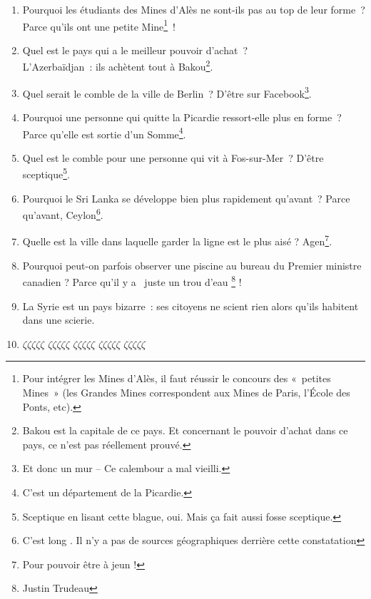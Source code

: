 \documentclass[10pt,a5paper,fullpage]{book}
\begin{document}
\begin{enumerate}
		\item Pourquoi les étudiants des Mines d’Alès ne sont-ils pas au top de leur forme~? Parce qu’ils ont une petite Mine\footnote{Pour intégrer les Mines d’Alès, il faut réussir le concours des « petites Mines » (les Grandes Mines correspondent aux Mines de Paris, l’École des Ponts, etc).}~!
		\item Quel est le pays qui a le meilleur pouvoir d’achat~? \\L’Azerbaïdjan~: ils achètent tout à Bakou\footnote{Bakou est la capitale de ce pays. Et concernant le pouvoir d'achat dans ce pays, ce n'est pas réellement prouvé.}.
		\item Quel serait le comble de la ville de Berlin~? D'être sur Facebook\footnote{ Et donc un mur -- Ce calembour a mal vieilli.}. 
		\item Pourquoi une personne qui quitte la Picardie ressort-elle plus en forme~? Parce qu'elle est sortie d'un Somme\footnote{C'est un département de la Picardie.}. 
		\item Quel est le comble pour une personne qui vit à Fos-sur-Mer~? D'être sceptique\footnote{Sceptique en lisant cette blague, oui. Mais ça fait aussi fosse sceptique.}.
		\item Pourquoi le Sri Lanka se développe bien plus rapidement qu'avant~? Parce qu'avant, Ceylon\footnote{\guillemotleft C'est long \guillemotright. Il n'y a pas de sources géographiques derrière cette constatation}. 
		\item Quelle est la ville dans laquelle garder la ligne est le plus aisé ? Agen\footnote{Pour pouvoir être à jeun !}.
		\item Pourquoi peut-on parfois observer une piscine au bureau du Premier ministre canadien ? Parce qu'il y a \guillemotleft~juste un trou d'eau \guillemotright \footnote{Justin Trudeau} !
		\item La Syrie est un pays bizarre~: ses citoyens ne scient rien alors qu'ils habitent dans une scierie. 
		\item $\zeta\zeta\zeta\zeta\zeta$ $\zeta\zeta\zeta\zeta\zeta$ $\zeta\zeta\zeta\zeta\zeta$ $\zeta\zeta\zeta\zeta\zeta$ $\zeta\zeta\zeta\zeta\zeta$ \\ 

\end{enumerate}
\end{document}
